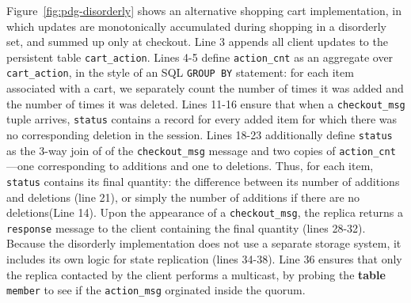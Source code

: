 Figure~\ref{fig:pdg-disorderly} shows an alternative shopping cart implementation, in which
updates are monotonically accumulated during shopping in a disorderly set, and summed up
only at checkout.  Line 3 appends all client updates to the persistent table
\texttt{cart\_action}.  Lines 4-5 define \texttt{action\_cnt} as an aggregate
over \texttt{cart\_action}, in the style of an SQL \texttt{GROUP BY} statement: for each
item associated with a cart, we separately count the number of times it was
added and the number of times it was deleted.   
Lines 11-16 ensure that when a \texttt{checkout\_msg} tuple arrives, \texttt{status} 
contains a record for every added item
for which there was no corresponding deletion in the session.  Lines 18-23 
additionally define \texttt{status} as the 3-way join of of the \texttt{checkout\_msg}
message and two copies of \texttt{action\_cnt}---one corresponding to additions and one to
deletions.
Thus, for each item, \texttt{status} contains its final quantity: the
difference between its number of additions and deletions (line 21), or simply the number
of additions if there are no deletions(Line 14). 
Upon the appearance of a \texttt{checkout\_msg}, the
replica returns a \texttt{response} message to the client containing the
final quantity (lines 28-32).  
Because the disorderly implementation does not use a separate
storage system, it includes its own logic for state replication (lines 34-38).
Line 36 ensures that only the replica contacted by the client performs a multicast,
by probing the \textbf{table} \texttt{member} to see if the \texttt{action\_msg} 
orginated inside the quorum.

